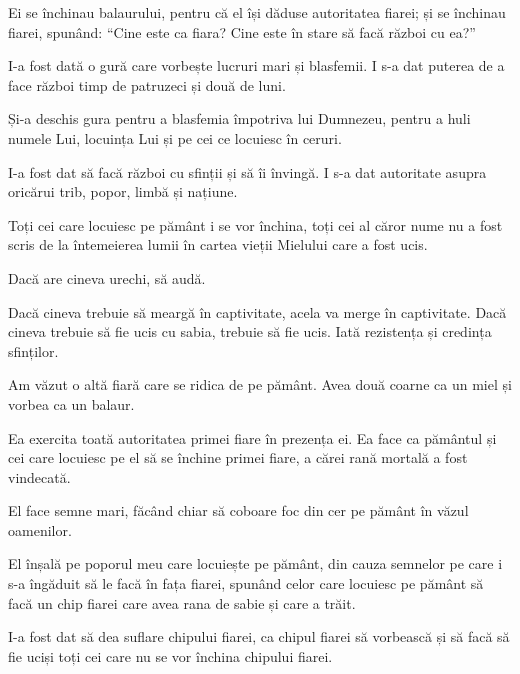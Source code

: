 {Ei se închinau balaurului, pentru că el își dăduse autoritatea fiarei; și se închinau fiarei, spunând: “Cine este ca fiara? Cine este în stare să facă război cu ea?”


\par }{\PP {}I-a fost dată o gură care vorbește lucruri mari și blasfemii. I s-a dat puterea de a face război timp de patruzeci și două de luni.

Și-a deschis gura pentru a blasfemia împotriva lui Dumnezeu, pentru a huli numele Lui, locuința Lui și pe cei ce locuiesc în ceruri.

I-a fost dat să facă război cu sfinții și să îi învingă. I s-a dat autoritate asupra oricărui trib, popor, limbă și națiune.

Toți cei care locuiesc pe pământ i se vor închina, toți cei al căror nume nu a fost scris de la întemeierea lumii în cartea vieții Mielului care a fost ucis.

Dacă are cineva urechi, să audă.

Dacă cineva trebuie să meargă în captivitate, acela va merge în captivitate. Dacă cineva trebuie să fie ucis cu sabia, trebuie să fie ucis. Iată rezistența și credința sfinților.


\par }{\PP {}Am văzut o altă fiară care se ridica de pe pământ. Avea două coarne ca un miel și vorbea ca un balaur.

Ea exercita toată autoritatea primei fiare în prezența ei. Ea face ca pământul și cei care locuiesc pe el să se închine primei fiare, a cărei rană mortală a fost vindecată.

El face semne mari, făcând chiar să coboare foc din cer pe pământ în văzul oamenilor.

El înșală pe
poporul meu care locuiește pe pământ, din cauza semnelor pe care i s-a îngăduit să le facă în fața fiarei, spunând celor care locuiesc pe pământ să facă un chip fiarei care avea rana de sabie și care a trăit.

I-a fost dat să dea suflare chipului fiarei, ca chipul fiarei să vorbească și să facă să fie uciși toți cei care nu se vor închina chipului fiarei.

}

